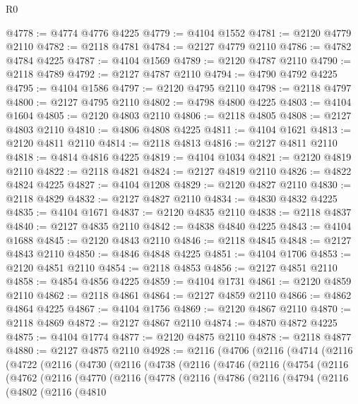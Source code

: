 \begin{lexlean}{R0}
\begin{coremodule}
@4778 := @4774 @4776 @4225
@4779 := @4104 @1552
@4781 := @2120 @4779 @2110
@4782 := @2118 @4781
@4784 := @2127 @4779 @2110
@4786 := @4782 @4784 @4225
@4787 := @4104 @1569
@4789 := @2120 @4787 @2110
@4790 := @2118 @4789
@4792 := @2127 @4787 @2110
@4794 := @4790 @4792 @4225
@4795 := @4104 @1586
@4797 := @2120 @4795 @2110
@4798 := @2118 @4797
@4800 := @2127 @4795 @2110
@4802 := @4798 @4800 @4225
@4803 := @4104 @1604
@4805 := @2120 @4803 @2110
@4806 := @2118 @4805
@4808 := @2127 @4803 @2110
@4810 := @4806 @4808 @4225
@4811 := @4104 @1621
@4813 := @2120 @4811 @2110
@4814 := @2118 @4813
@4816 := @2127 @4811 @2110
@4818 := @4814 @4816 @4225
@4819 := @4104 @1034
@4821 := @2120 @4819 @2110
@4822 := @2118 @4821
@4824 := @2127 @4819 @2110
@4826 := @4822 @4824 @4225
@4827 := @4104 @1208
@4829 := @2120 @4827 @2110
@4830 := @2118 @4829
@4832 := @2127 @4827 @2110
@4834 := @4830 @4832 @4225
@4835 := @4104 @1671
@4837 := @2120 @4835 @2110
@4838 := @2118 @4837
@4840 := @2127 @4835 @2110
@4842 := @4838 @4840 @4225
@4843 := @4104 @1688
@4845 := @2120 @4843 @2110
@4846 := @2118 @4845
@4848 := @2127 @4843 @2110
@4850 := @4846 @4848 @4225
@4851 := @4104 @1706
@4853 := @2120 @4851 @2110
@4854 := @2118 @4853
@4856 := @2127 @4851 @2110
@4858 := @4854 @4856 @4225
@4859 := @4104 @1731
@4861 := @2120 @4859 @2110
@4862 := @2118 @4861
@4864 := @2127 @4859 @2110
@4866 := @4862 @4864 @4225
@4867 := @4104 @1756
@4869 := @2120 @4867 @2110
@4870 := @2118 @4869
@4872 := @2127 @4867 @2110
@4874 := @4870 @4872 @4225
@4875 := @4104 @1774
@4877 := @2120 @4875 @2110
@4878 := @2118 @4877
@4880 := @2127 @4875 @2110
@4928 := @2116
    (@4706
      (@2116
        (@4714
          (@2116
            (@4722
              (@2116
                (@4730
                  (@2116
                    (@4738
                      (@2116
                        (@4746
                          (@2116
                            (@4754
                              (@2116
                                (@4762
                                  (@2116
                                    (@4770
                                      (@2116
                                        (@4778
                                          (@2116
                                            (@4786
                                              (@2116
                                                (@4794
                                                  (@2116
                                                    (@4802
                                                      (@2116
                                                        (@4810

\end{coremodule}
\end{lexlean}
